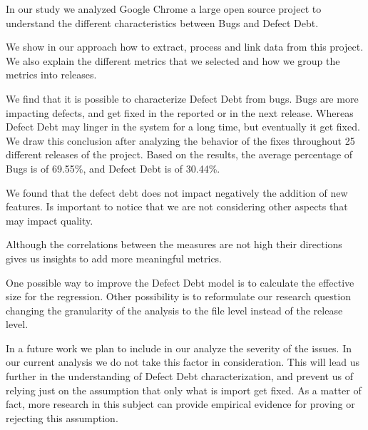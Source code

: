 In our study we analyzed Google Chrome a large open source project to understand the different characteristics between Bugs and Defect Debt. 

We show in our approach how to extract, process and link data from this project. We also explain the different metrics that we selected and how we group the metrics into releases. 

We find that it is possible to characterize Defect Debt from bugs. Bugs are more impacting defects, and get fixed in the reported or in the next release. Whereas Defect Debt may linger in the system for a long time, but eventually it get fixed. We draw this conclusion after analyzing the behavior of the fixes throughout 25 different releases of the project. Based on the results, the average percentage of Bugs is of 69.55\%, and Defect Debt is of 30.44\%.

We found that the defect debt does not impact negatively the addition of new features. Is important to notice that we are not considering other aspects that may impact quality.  

Although the correlations between the measures are not high their directions gives us insights to add more meaningful metrics.

One possible way to improve the Defect Debt model is to calculate the effective size for the regression. Other possibility is to reformulate our research question changing the granularity of the analysis to the file level instead of the release level.

In a future work we plan to include in our analyze the severity of the issues. In our current analysis we do not take this factor in consideration. This will lead us further in the understanding of Defect Debt characterization, and prevent us of relying just on the assumption that only what is import get fixed. As a matter of fact, more research in this subject can provide empirical evidence for proving or rejecting this assumption.